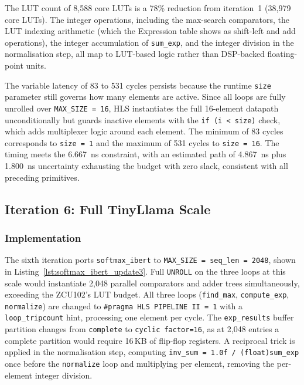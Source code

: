 The LUT count of 8{,}588 core LUTs is a 78\% reduction from iteration~1
(38{,}979 core LUTs). The integer operations, including the max-search
comparators, the LUT indexing arithmetic (which the Expression table shows
as shift-left and add operations), the integer accumulation of
\texttt{sum\_exp}, and the integer division in the normalisation step, all
map to LUT-based logic rather than DSP-backed floating-point units.

The variable latency of 83 to 531 cycles persists because the runtime
\texttt{size} parameter still governs how many elements are active. Since all
loops are fully unrolled over \texttt{MAX\_SIZE = 16}, HLS instantiates the
full 16-element datapath unconditionally but guards inactive elements with the
\texttt{if (i < size)} check, which adds multiplexer logic around each element.
The minimum of 83 cycles corresponds to \texttt{size\,=\,1} and the maximum of
531 cycles to \texttt{size\,=\,16}. The timing meets the
\SI{6.667}{\nano\second} constraint, with an estimated path of
\SI{4.867}{\nano\second} plus \SI{1.800}{\nano\second} uncertainty exhausting
the budget with zero slack, consistent with all preceding primitives.

\subsection{Iteration 6: Full TinyLlama Scale}
\label{subsec:softmax_ibert_update3}

\subsubsection{Implementation}
\label{subsubsec:softmax_ibert_update3_impl}

The sixth iteration ports \texttt{softmax\_ibert} to
\texttt{MAX\_SIZE\,=\,seq\_len\,=\,2048}, shown in
Listing~\ref{lst:softmax_ibert_update3}. Full \texttt{UNROLL} on the
three loops at this scale would instantiate 2{,}048 parallel comparators
and adder trees simultaneously, exceeding the ZCU102's LUT budget. All
three loops (\texttt{find\_max}, \texttt{compute\_exp}, \texttt{normalize})
are changed to \texttt{\#pragma HLS PIPELINE II\,=\,1} with a
\texttt{loop\_tripcount} hint, processing one element per cycle. The
\texttt{exp\_results} buffer partition changes from \texttt{complete}
to \texttt{cyclic factor=16}, as at 2{,}048 entries a complete partition
would require 16\,KB of flip-flop registers. A reciprocal trick is applied
in the normalisation step, computing \texttt{inv\_sum = 1.0f\,/\,(float)sum\_exp}
once before the \texttt{normalize} loop and multiplying per element,
removing the per-element integer division.

